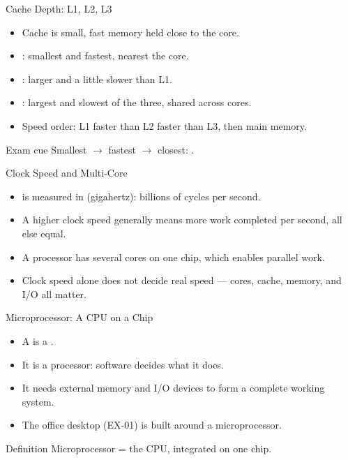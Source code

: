 \documentclass[aspectratio=169]{beamer}
\begin{document}
\begin{frame}{Cache Depth: L1, L2, L3}
  \begin{itemize}
    \item Cache is small, fast memory held close to the core.
    \item {}: smallest and fastest, nearest the core.
    \item {}: larger and a little slower than L1.
    \item {}: largest and slowest of the three, shared across cores.
    \item Speed order: L1 faster than L2 faster than L3, then main memory.
  \end{itemize}
  \begin{block}{Exam cue}
    Smallest $\rightarrow$ fastest $\rightarrow$ closest:
    .
  \end{block}
\end{frame}

\begin{frame}{Clock Speed and Multi-Core}
  \begin{itemize}
    \item {} is measured in  (gigahertz): billions of
      cycles per second.
    \item A higher clock speed generally means more work completed per second,
      all else equal.
    \item A  processor has several cores on one chip, which
      enables parallel work.
    \item Clock speed alone does not decide real speed --- cores, cache,
      memory, and I/O all matter.
  \end{itemize}
\end{frame}

\begin{frame}{Microprocessor: A CPU on a Chip}
  \begin{itemize}
    \item A  is a .
    \item It is a  processor: software decides what it
      does.
    \item It needs external memory and I/O devices to form a complete working
      system.
    \item The office desktop (EX-01) is built around a microprocessor.
  \end{itemize}
  \begin{block}{Definition}
    Microprocessor = the CPU, integrated on one chip.
  \end{block}
\end{frame}
\end{document}
